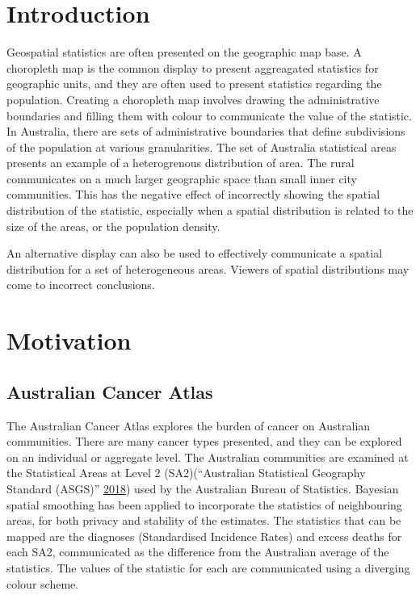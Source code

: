 \documentclass[conference,final,]{IEEEtran}
\begin{document}
\hypertarget{introduction}{%
\section{Introduction}\label{introduction}}

Geospatial statistics are often presented on the geographic map base. A
choropleth map is the common display to present aggreagated statistics
for geographic units, and they are often used to present statistics
regarding the population. Creating a choropleth map involves drawing the
administrative boundaries and filling them with colour to communicate
the value of the statistic. In Australia, there are sets of
administrative boundaries that define subdivisions of the population at
various granularities. The set of Australia statistical areas presents
an example of a heterogrenous distribution of area. The rural
communicates on a much larger geographic space than small inner city
communities. This has the negative effect of incorrectly showing the
spatial distribution of the statistic, especially when a spatial
distribution is related to the size of the areas, or the population
density.

An alternative display can also be used to effectively communicate a
spatial distribution for a set of heterogeneous areas. Viewers of
spatial distributions may come to incorrect conclusions.

\hypertarget{motivation}{%
\section{Motivation}\label{motivation}}

\hypertarget{australian-cancer-atlas}{%
\subsection{Australian Cancer Atlas}\label{australian-cancer-atlas}}

The Australian Cancer Atlas explores the burden of cancer on Australian
communities. There are many cancer types presented, and they can be
explored on an individual or aggregate level. The Australian communities
are examined at the Statistical Areas at Level 2 (SA2)(``Australian
Statistical Geography Standard (ASGS)''
\protect\hyperlink{ref-abs2016}{2018}) used by the Australian Bureau of
Statistics. Bayesian spatial smoothing has been applied to incorporate
the statistics of neighbouring areas, for both privacy and stability of
the estimates. The statistics that can be mapped are the diagnoses
(Standardised Incidence Rates) and excess deaths for each SA2,
communicated as the difference from the Australian average of the
statistics. The values of the statistic for each are communicated using
a diverging colour scheme.
\end{document}
